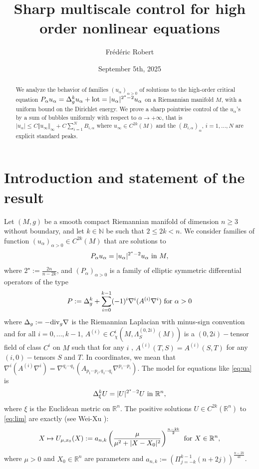 \documentclass[reqno]{amsart}
\title{Sharp multiscale control for  high order nonlinear equations}
\author{Fr\'ed\'eric Robert}
\date{September 5th, 2025}
\def \rn {\mathbb{R}^n}
\def \nn {\mathbb{N}}
\def \crit {2^\star}
\def \ua {u_\alpha}
\begin{document}
\begin{abstract} We analyze the behavior of families $(\ua)_{\alpha>0}$ of solutions to the high-order critical equation $P_\alpha\ua=\Delta_g^k\ua +\hbox{lot}=|\ua|^{\crit-2}\ua$ on a Riemannian manifold $M$, with a uniform bound on the Dirichlet energy. We prove a sharp pointwise   control of the $\ua$'s by a sum of bubbles uniformly with respect to $\alpha\to +\infty$, that is
$|\ua|\leq  C\Vert u_\infty \Vert_\infty +C\sum_{i=1}^NB_{i,\alpha}$ where $u_\infty \in C^{2k}(M)$ and the $(B_{i,\alpha})_\alpha$, $i=1,...,N$ are explicit standard peaks. 
\end{abstract}
\maketitle

\section{Introduction and statement of the result}
Let $(M,g)$ be a smooth compact Riemannian manifold of dimension $n\geq 3$ without boundary, and let $k\in\nn$ be such that $2\leq 2k<n$. We consider families of function $(\ua)_{\alpha>0}\in C^{2k}(M)$ that are solutions to
\begin{equation}\label{eq:ua}
P_\alpha u_\alpha=|u_\alpha|^{\crit-2}u_\alpha\hbox{ in }M,
\end{equation}
where $\crit:=\frac{2n}{n-2k}$, and $(P_\alpha)_{\alpha>0}$ is a family of   elliptic symmetric differential operators of the type
\begin{equation}\label{model:P}
P:=\Delta_g^k+\sum_{i=0}^{k-1} (-1)^i\nabla^i(A^{(i)} \nabla^i)\hbox{ for }\alpha>0
\end{equation}
where $\Delta_g:=-\hbox{div}_g\nabla$ is the Riemannian Laplacian with minus-sign convention and for all $i=0,...,k-1$, $ A^{(i)}\in C^{i}_{\chi}(M,\Lambda_{S}^{(0,2i)}(M))$ is a $(0,2i)-$tensor field of class $C^i$ on $M$ such that for any $i$ , $A^{(i)}(T,S)=A^{(i)}(S,T)$ for any $(i,0)-$tensors $S$ and $T$. In coordinates, we mean that $\nabla^i(A^{(i)} \nabla^i)=\nabla^{q_i\cdots q_1}(A_{p_1\cdots p_i,q_1\cdots q_i}\nabla^{p_1\cdots p_i})$. The model for equations like \eqref{eq:ua} is
\begin{equation}\label{eq:lim}
\Delta_\xi^k U=|U|^{\crit-2}U\hbox{ in }\rn,
\end{equation}
where $\xi$ is the Euclidean metric on $\rn$. The positive solutions $U\in C^{2k}(\rn)$ to \eqref{eq:lim} are exactly (see Wei-Xu \cite{weixu}):
\begin{equation*}
X\mapsto U_{\mu, x_0}(X):=a_{n,k}\left(\frac{\mu }{\mu^2 +|X-X_0|^2}\right)^{\frac{n-2k}{2}}\hbox{ for }X\in\rn,
\end{equation*}
where $\mu >0$ and $X_0\in\rn$ are parameters and $a_{n,k}:=\left(\Pi_{j=-k}^{k-1}(n+2j)\right)^{\frac{n-2k}{4k}}$.
\end{document}

